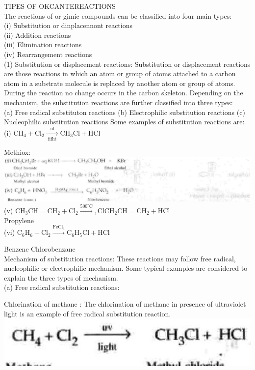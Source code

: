 \documentclass[10pt]{article}
\begin{document}
TIPES OF OKCANTEREACTIONS\\
The reactions of or gimic compounds can be classified into four main types:\\
(i) Substitution or dinplacennont reactions\\
(ii) Addition reactions\\
(iii) Elimination reactions\\
(iv) Rearrangement reactions\\
(1) Substitution or displacement reactions: Substitution or displacement reactions are those reactions in which an atom or group of atoms attached to a carbon atom in a substrate molecule is replaced by another atom or group of atoms. During the reaction no change occurs in the carbon skeleton. Depending on the mechanism, the substitution reactions are further classified into three types:\\
(a) Free radical substituton reactions (b) Electrophilic substitution reactions (c) Nucleophilic substitution reactions Some examples of substitution reactions are:\\
(i) $\mathrm{CH}_{4}+\mathrm{Cl}_{2} \xrightarrow[\text { iifht }]{\text { ul }} \mathrm{CH}_{3} \mathrm{Cl}+\mathrm{HCl}$

Methiox:\\
\includegraphics[max width=\textwidth, center]{2025_01_28_8470952b98110cec3aabg-090(2)}\\
(v) $\mathrm{CH}_{3} \mathrm{CH}=\mathrm{CH}_{2}+\mathrm{Cl}_{2} \xrightarrow{500^{\circ} \mathrm{C}}, \mathrm{ClCH}_{2} \mathrm{CH}=\mathrm{CH}_{2}+\mathrm{HCl}$\\
Propylene\\
(vi) $\mathrm{C}_{6} \mathrm{H}_{6}+\mathrm{Cl}_{2} \xrightarrow{\mathrm{FeCl}_{3}} \mathrm{C}_{6} \mathrm{H}_{5} \mathrm{Cl}+\mathrm{HCl}$

Benzene Chlorobenzane\\
Mechanism of substitution reactions: These reactions may follow free radical, nucleophilic or electrophilic mechanism. Some typical examples are considered to explain the three types of mechanism.\\
(a) Free radical substitution reactions:

Chlorination of methane : The chlorination of methane in presence of ultraviolet light is an example of free radical substitution reaction.\\
\includegraphics[max width=\textwidth, center]{2025_01_28_8470952b98110cec3aabg-091(1)}
\end{document}
